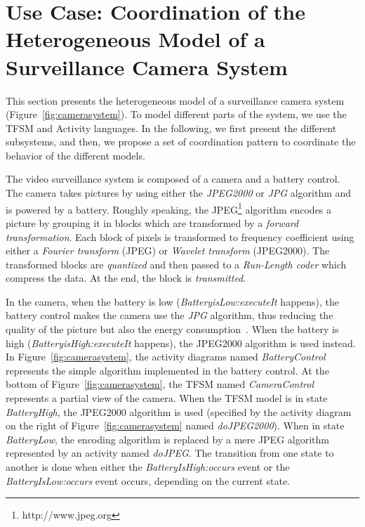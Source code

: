 \section{Use Case: Coordination of the Heterogeneous Model of a Surveillance Camera System}
This section presents the heterogeneous model of a surveillance camera system (Figure~\ref{fig:camerasystem}). To model different parts of the system, we use the TFSM and Activity languages. In the following, we first present the different subsystems, and then, we propose a set of coordination pattern to coordinate the behavior of the different models. 

The video surveillance system is composed of a camera and a battery control. The camera takes pictures by using either the \emph{JPEG2000} or \emph{JPG} algorithm and is powered by a battery. Roughly speaking, the JPEG\footnote{http://www.jpeg.org} algorithm encodes a picture by grouping it in blocks which are transformed by a \textit{forward transformation}. Each block of pixels is transformed to frequency coefficient using either a \textit{Fourier transform} (JPEG) or \textit{Wavelet transform} (JPEG2000). The transformed blocks are \textit{quantized} and then passed to a \textit{Run-Length coder} which compress the data. At the end, the block is \textit{transmitted}. 

In the camera, when the battery is low (\emph{BatteryisLow:executeIt} happens), the battery control makes the camera use the \emph{JPG} algorithm, thus reducing the quality of the picture but also the energy consumption~\cite{encodingcomparison}. When the battery is high (\emph{BatteryisHigh:executeIt} happens), the JPEG2000 algorithm is used instead. In Figure~\ref{fig:camerasystem}, the activity diagrams named \emph{BatteryControl} represents the simple algorithm implemented in the battery control. At the bottom of Figure~\ref{fig:camerasystem}, the TFSM named \emph{CameraControl} represents a partial view of the camera. When the TFSM model is in state \emph{BatteryHigh}, the JPEG2000 algorithm is used (specified by the activity diagram on the right of Figure~\ref{fig:camerasystem} named \emph{doJPEG2000}). When in state \emph{BatteryLow}, the encoding algorithm is replaced by a mere JPEG algorithm represented by an activity named \emph{doJPEG}. The transition from one state to another is done when either the \emph{BatteryIsHigh:occurs} event or the \emph{BatteryIsLow:occurs} event occurs, depending on the current state.	   

